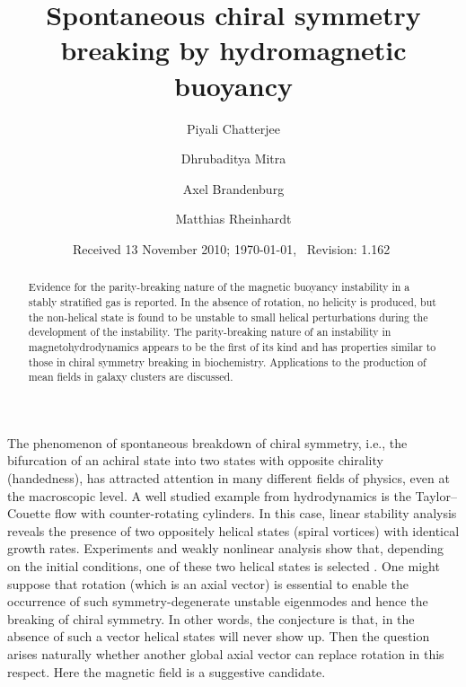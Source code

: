 \documentclass[twocolumn,showpacs,preprintnumbers,superscriptaddress]{revtex4}
\begin{document}

\title{Spontaneous chiral symmetry breaking by hydromagnetic buoyancy}
\author{Piyali Chatterjee}

\author{Dhrubaditya Mitra}

\author{Axel Brandenburg}

\author{Matthias Rheinhardt}

\date{Received 13 November 2010; \today,~ $ $Revision: 1.162 $ $}

\begin{abstract}
Evidence for the parity-breaking nature of the magnetic buoyancy instability
in a stably stratified gas is reported.
In the absence of rotation, no helicity is produced, but the non-helical state
is found to be unstable to small helical perturbations during the development
of the instability.
The parity-breaking nature of an instability in magnetohydrodynamics
appears to be the first of its kind and has properties similar to those
in chiral symmetry breaking in biochemistry.
Applications to the production of mean fields in galaxy clusters
are discussed.
\end{abstract}


\maketitle

The phenomenon of spontaneous breakdown of chiral symmetry, i.e.,
the bifurcation of an achiral state into two
states with opposite chirality (handedness),
has attracted attention in many different fields of physics, even at the macroscopic level.
A well studied example from hydrodynamics is the
Taylor--Couette flow with counter-rotating cylinders. 
In this case, linear stability analysis reveals the presence of 
two oppositely helical states (spiral vortices) with
identical growth rates.
Experiments and weakly nonlinear analysis show that, depending on the
initial conditions, one of these two
helical states is selected \cite{Hoffetal05}.  
One might suppose that rotation (which is an axial vector) is essential to enable 
the occurrence of such symmetry-degenerate unstable eigenmodes
and hence the breaking of chiral symmetry.
In other words, the conjecture
is that, in the absence of such a vector
helical states will never show up. 
Then the question arises naturally whether another
global
axial vector
can replace rotation in this respect.
Here the magnetic field is a suggestive candidate.
\end{document}

